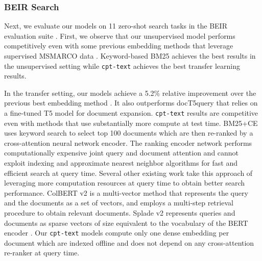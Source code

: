 \documentclass[nohyperref]{article}
\begin{document}
\subsubsection{BEIR Search}
\label{sec:beir}
Next, we evaluate our models on 11 zero-shot search tasks in the BEIR evaluation suite \cite{beir}. First, we observe that our unsupervised model performs competitively even with some previous embedding methods that leverage supervised MSMARCO data \cite{Xiong,tas}. Keyword-based BM25 \cite{bm25} achieves the best results in the unsupervised setting while \texttt{cpt-text} achieves the best transfer learning results.  

In the transfer setting, our models achieve a 5.2\% relative improvement over the previous best embedding method \cite{contreiver}. It also outperforms docT5query \cite{doct5} that relies on a fine-tuned T5 model \cite{t5} for document expansion. \texttt{cpt-text} results are competitive even with methods that use substantially more compute at test time. BM25+CE \cite{mini} uses keyword search to select top 100 documents which are then re-ranked by a cross-attention neural network encoder. The ranking encoder network performs computationally expensive joint query and document attention and cannot exploit indexing and approximate nearest neighbor algorithms for fast and efficient search at query time. Several other existing work take this approach of leveraging more computation resources at query time to obtain better search performance. ColBERT v2 \cite{colbert} is a multi-vector method that represents the query and the documents as a set of vectors, and employs a multi-step retrieval procedure to obtain relevant documents. Splade v2 \cite{splade} represents queries and documents as sparse vectors of size equivalent to the vocabulary of the BERT encoder \cite{bert}. Our \texttt{cpt-text} models compute only one dense embedding per document which are indexed offline and does not depend on any cross-attention re-ranker at query time.
\end{document}
